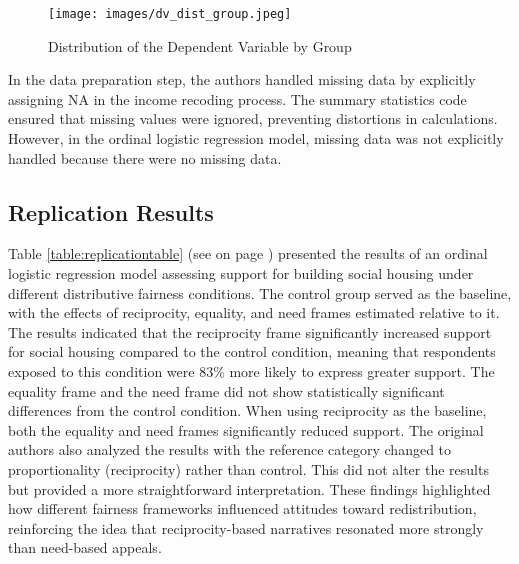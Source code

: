 \documentclass[titlepage]{article}
\begin{document}
\begin{figure}[H]
    \centering
    \texttt{[image: images/dv\_dist\_group.jpeg]}
    \caption{Distribution of the Dependent Variable by Group}
    \label{fig:dv_group}
\end{figure}

\justify
In the data preparation step, the authors handled missing data by explicitly assigning NA in the income recoding process. The summary statistics code ensured that missing values were ignored, preventing distortions in calculations. However, in the ordinal logistic regression model, missing data was not explicitly handled because there were no missing data.

\subsection{Replication Results}
Table \ref{table:replicationtable} (see on page \pageref{table:replicationtable}) presented the results of an ordinal logistic regression model assessing support for building social housing under different distributive fairness conditions. The control group served as the baseline, with the effects of reciprocity, equality, and need frames estimated relative to it. The results indicated that the reciprocity frame significantly increased support for social housing compared to the control condition, meaning that respondents exposed to this condition were 83\% more likely to express greater support. The equality frame and the need frame did not show statistically significant differences from the control condition. When using reciprocity as the baseline, both the equality and need frames significantly reduced support. The original authors also analyzed the results with the reference category changed to proportionality (reciprocity) rather than control. This did not alter the results but provided a more straightforward interpretation. These findings highlighted how different fairness frameworks influenced attitudes toward redistribution, reinforcing the idea that reciprocity-based narratives resonated more strongly than need-based appeals.
\end{document}
